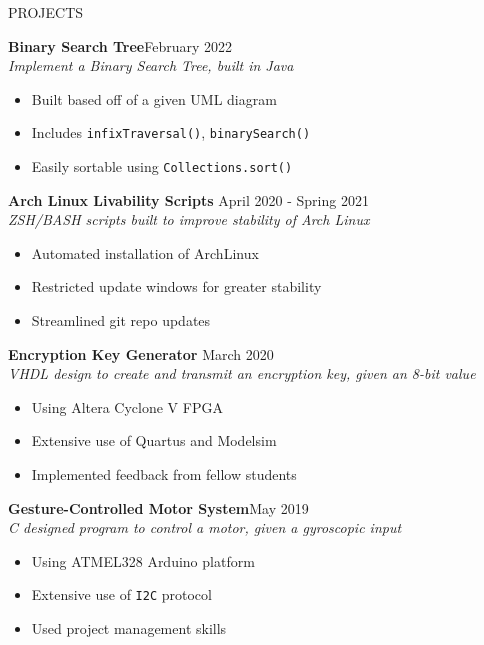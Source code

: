 \documentclass[UTF-8]{resume} \usepackage{multirow}
\begin{document}
\begin{rSection}{PROJECTS}
	\vspace{-1.5em}
\item \textbf{Binary Search Tree}\hfill {February 2022} \\
    \emph{ Implement a Binary Search Tree, built in Java}
	\begin{itemize}
         \itemsep -5pt {}
	      \item Built based off of a given UML diagram
          \item Includes \verb|infixTraversal()|, \verb|binarySearch()|
          \item Easily sortable using \verb|Collections.sort()|
	\end{itemize}
\item \textbf{Arch Linux Livability Scripts} \hfill {April 2020 - Spring 2021}\\
	\emph{ZSH/BASH scripts built to improve stability of Arch Linux}
	\begin{itemize}
	    \itemsep -5pt {}
             \item Automated installation of ArchLinux
             \item Restricted update windows for greater stability
             \item Streamlined git repo updates
	\end{itemize}
\item \textbf{Encryption Key Generator} \hfill{March 2020}\\
	\emph{VHDL design to create and transmit an encryption key, given an 8-bit value}
       \begin{itemize}
           \itemsep -5pt {}
	        \item Using Altera Cyclone V FPGA
		    \item Extensive use of Quartus and Modelsim
            \item Implemented feedback from fellow students
	\end{itemize}
\item \textbf{Gesture-Controlled Motor System}\hfill {May 2019}\\
	\emph{C designed program to control a motor, given a gyroscopic input}
	\begin{itemize}
          \itemsep -5pt {}
	       \item Using ATMEL328 Arduino platform
	       \item Extensive use of \verb|I2C| protocol
           \item Used project management skills
	\end{itemize}
\end{rSection}
\end{document}
